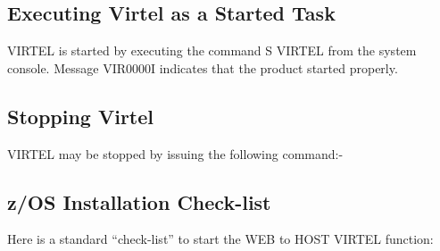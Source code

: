 \documentclass[letterpaper,10pt,english]{sphinxmanual}
\begin{document}
\begin{sphinxVerbatim}[commandchars=\\\{\}]
  
\end{sphinxVerbatim}


\subsection{Executing Virtel as a Started Task}
\label{\detokenize{Installation_Guide:executing-virtel-as-a-started-task}}
VIRTEL is started by executing the command S VIRTEL from the system console. Message VIR0000I indicates that the product started properly.


\subsection{Stopping Virtel}
\label{\detokenize{Installation_Guide:stopping-virtel}}
VIRTEL may be stopped by issuing the following command:-

\begin{sphinxVerbatim}[commandchars=\\\{\}]
 
\end{sphinxVerbatim}


\subsection{z/OS Installation Check-list}
\label{\detokenize{Installation_Guide:index-16}}\label{\detokenize{Installation_Guide:z-os-installation-check-list}}
Here is a standard “check-list” to start the WEB to HOST VIRTEL function:
\end{document}
